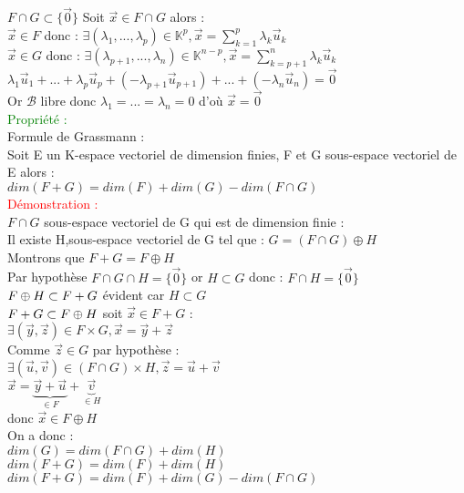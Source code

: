 \documentclass{article}
\begin{document}
{\boldmath $F \cap G \subset \lbrace \vec 0 \rbrace $} Soit $\vec x \in F \cap G$ alors : \\
$\vec x \in F$ donc : $\exists (\lambda_1,...,\lambda_p) \in \mathbb K^p, \vec x= \sum_{k=1}^p \lambda_k \vec u_k$ \\
$\vec x \in G$ donc : $\exists (\lambda_{p+1},...,\lambda_n) \in \mathbb K^{n-p}, \vec x= \sum_{k=p+1}^n \lambda_k \vec u_k$ \\
$\lambda_1 \vec u_1 +... +\lambda_p \vec u_p + (-\lambda_{p+1} \vec u_{p+1})+...+(- \lambda_n \vec u_n)= \vec 0$ \\
Or $\mathcal B$ libre donc $\lambda_1=...=\lambda_n=0$ d'où $\vec x= \vec 0$ \\
\textcolor{green}{Propriété :} \\
Formule de Grassmann : \\
Soit E un K-espace vectoriel de dimension finies, F et G sous-espace vectoriel de E alors : \\
$dim(F+G)=dim(F)+dim(G)-dim(F \cap G)$ \\
\textcolor{red}{Démonstration :} \\
$F \cap G$ sous-espace vectoriel de G qui est de dimension finie : \\
Il existe H,sous-espace vectoriel de G tel que : $G=(F \cap G) \oplus H$ \\
Montrons que $F+G=F \oplus H$ \\
Par hypothèse $F \cap G \cap H =\lbrace \vec 0 \rbrace$ or $H \subset G$ donc : $F \cap H=\lbrace \vec 0 \rbrace$ \\
{$\boldmath F\oplus H \subset F+G$} évident car $H \subset G$ \\
{$\boldmath F+G \subset F \oplus H $} soit $\vec x \in F+G$ : \\
$\exists (\vec y , \vec z) \in F \times G, \vec x =\vec y + \vec z$ \\
Comme $\vec z \in G $ par hypothèse : \\
$\exists (\vec u, \vec v) \in (F \cap G) \times H, \vec z= \vec u + \vec v$ \\
$\vec x= \underbrace{ \vec y +\vec u}_{\in F} + \underbrace{\vec v}_{\in H}$ \\
donc $\vec x \in F \oplus H$ \\
On a donc : \\
$dim(G)=dim(F \cap G) +dim(H)$ \\
$dim(F+G) = dim(F)+ dim(H)$ \\
$dim(F+G)=dim(F)+dim(G)-dim(F \cap G)$
\end{document}
